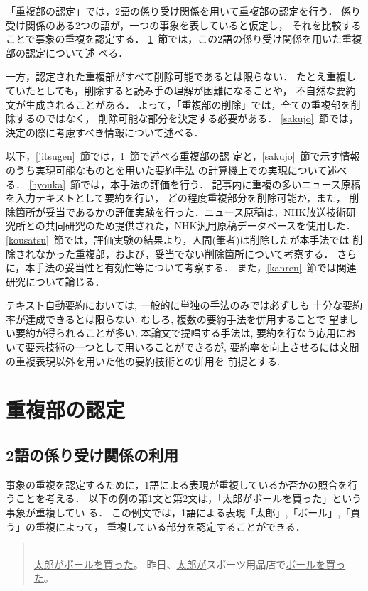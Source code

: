 「重複部の認定」では，2語の係り受け関係を用いて重複部の認定を行う．
係り受け関係のある2つの語が，一つの事象を表していると仮定し，
それを比較することで事象の重複を認定する．
\ref{nintei}~節では，この2語の係り受け関係を用いた重複部の認定について述
べる．

一方，認定された重複部がすべて削除可能であるとは限らない．
たとえ重複していたとしても，削除すると読み手の理解が困難になることや，
不自然な要約文が生成されることがある．
よって，「重複部の削除」では，全ての重複部を削除するのではなく，
削除可能な部分を決定する必要がある．
\ref{sakujo}~節では，決定の際に考慮すべき情報について述べる．

以下，\ref{jitsugen}~節では，\ref{nintei}~節で述べる重複部の認
定と，\ref{sakujo}~節で示す情報のうち実現可能なものとを用いた要約手法
の計算機上での実現について述べる．
\ref{hyouka}~節では，本手法の評価を行う．
記事内に重複の多いニュース原稿を入力テキストとして要約を行い，
どの程度重複部分を削除可能か，また，
削除箇所が妥当であるかの評価実験を行った．ニュース原稿は，NHK放送技術研
究所との共同研究のため提供された，NHK汎用原稿データベースを使用した．
\ref{kousatsu}~節では，評価実験の結果より，人間(筆者)は削除したが本手法では
削除されなかった重複部，および，妥当でない削除箇所について考察する．
さらに，本手法の妥当性と有効性等について考察する．
また，\ref{kanren}~節では関連研究について論じる．

テキスト自動要約においては, 一般的に単独の手法のみでは必ずしも
十分な要約率が達成できるとは限らない. むしろ, 複数の要約手法を併用することで
望ましい要約が得られることが多い. 本論文で提唱する手法は, 
要約を行なう応用において要素技術の一つとして用いることができるが, 
要約率を向上させるには文間の重複表現以外を用いた他の要約技術との併用を
前提とする. 

\section{重複部の認定} \label{nintei}
\subsection{2語の係り受け関係の利用} \label{nintei_2goriyou}
事象の重複を認定するために，1語による表現が重複しているか否かの照合を行
うことを考える．
以下の例の第1文と第2文は，「太郎がボールを買った」という事象が重複してい
る．
この例文では，1語による表現「太郎」,「ボール」,「買う」の重複によって，
重複している部分を認定することができる．
\vspace{5mm}
\begin{quote} \label{rei:rei2}
\hspace*{-1em}{\bf 例2：}\\
\underline{太郎がボールを買った}。
昨日、\underline{太郎が}スポーツ用品店で\underline{ボールを買った}。
\end{quote}
\vspace{5mm}

